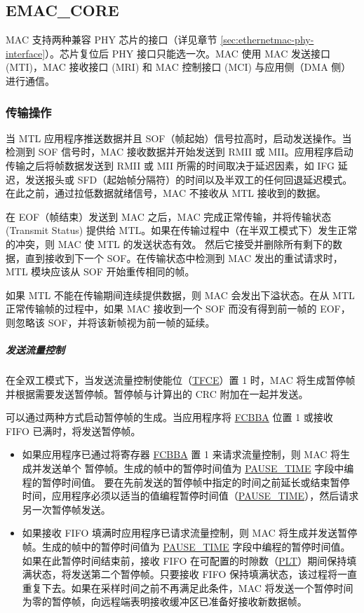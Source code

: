 \documentclass[main\_\_CN.tex]{subfiles}
\begin{document}
\subsection{EMAC\_CORE}
MAC 支持两种兼容 PHY 芯片的接口（详见章节 \ref{sec:ethernetmac-phy-interface}）。芯片复位后 PHY 接口只能选一次。MAC 使用 MAC 发送接口 (MTI)，MAC 接收接口 (MRI) 和 MAC 控制接口 (MCI) 与应用侧（DMA 侧）进行通信。

\subsubsection{传输操作}
当 MTL 应用程序推送数据并且 SOF（帧起始）信号拉高时，启动发送操作。当检测到 SOF 信号时，MAC 接收数据并开始发送到 RMII 或 MII。应用程序启动传输之后将帧数据发送到 RMII 或 MII 所需的时间取决于延迟因素，如 IFG 延迟，发送报头或 SFD（起始帧分隔符）的时间以及半双工的任何回退延迟模式。在此之前，通过拉低数据就绪信号，MAC 不接收从 MTL 接收到的数据。

在 EOF（帧结束）发送到 MAC 之后，MAC 完成正常传输，并将传输状态 (Transmit Status) 提供给 MTL。如果在传输过程中（在半双工模式下）发生正常的冲突，则 MAC 使 MTL 的发送状态有效。 然后它接受并删除所有剩下的数据，直到接收到下一个 SOF。在传输状态中检测到 MAC 发出的重试请求时，MTL 模块应该从 SOF 开始重传相同的帧。

如果 MTL 不能在传输期间连续提供数据，则 MAC 会发出下溢状态。在从 MTL 正常传输帧的过程中，如果 MAC 接收到一个 SOF 而没有得到前一帧的 EOF，则忽略该 SOF，并将该新帧视为前一帧的延续。


\subparagraph{发送流量控制}
在全双工模式下，当发送流量控制使能位（\hyperref[regdesc:EMACFLOWCONTROLREG]{TFCE}）置 1 时，MAC 将生成暂停帧并根据需要发送暂停帧。暂停帧与计算出的 CRC 附加在一起并发送。

可以通过两种方式启动暂停帧的生成。当应用程序将 \hyperref[regdesc:EMACFLOWCONTROLREG]{FCBBA} 位置 1 或接收 FIFO 已满时，将发送暂停帧。

\begin{itemize}
\item 如果应用程序已通过将寄存器 \hyperref[regdesc:EMACFLOWCONTROLREG]{FCBBA} 置 1 来请求流量控制，则 MAC 将生成并发送单个 暂停帧。生成的帧中的暂停时间值为 \hyperref[regdesc:EMACFLOWCONTROLREG]{PAUSE\_TIME} 字段中编程的暂停时间值。 要在先前发送的暂停帧中指定的时间之前延长或结束暂停时间，应用程序必须以适当的值编程暂停时间值（\hyperref[regdesc:EMACFLOWCONTROLREG]{PAUSE\_TIME}），然后请求 另一次暂停帧发送。
\item 如果接收 FIFO 填满时应用程序已请求流量控制，则 MAC 将生成并发送暂停帧。生成的帧中的暂停时间值为 \hyperref[regdesc:EMACFLOWCONTROLREG]{PAUSE\_TIME} 字段中编程的暂停时间值。如果在此暂停时间结束前，接收 FIFO 在可配置的时隙数（\hyperref[regdesc:EMACFLOWCONTROLREG]{PLT}）期间保持填满状态，将发送第二个暂停帧。只要接收 FIFO 保持填满状态，该过程将一直重复下去。如果在采样时间之前不再满足此条件，MAC 将发送一个暂停时间为零的暂停帧，向远程端表明接收缓冲区已准备好接收新数据帧。
\end{itemize}
\end{document}
